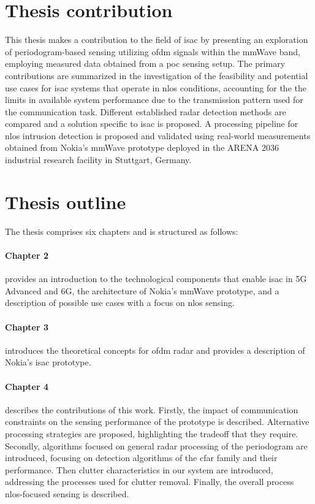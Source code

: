 \section{Thesis contribution}

This thesis makes a contribution to the field of \gls{isac} by presenting an exploration of periodogram-based sensing utilizing \gls{ofdm} signals within the mmWave band, employing measured data obtained from a \gls{poc} sensing setup.
The primary contributions are summarized in the investigation of the feasibility and potential use cases for \gls{isac} systems that operate in \gls{nlos} conditions, accounting for the the limits in available system performance due to the transmission pattern used for the communication task.
Different established radar detection methods are compared and a solution specific to \gls{isac} is proposed.
A processing pipeline for \gls{nlos} intrusion detection is proposed and validated using real-world measurements obtained from Nokia's mmWave prototype deployed in the ARENA 2036 industrial research facility in Stuttgart, Germany.

\section{Thesis outline}

The thesis comprises six chapters and is structured as follows:
\paragraph{Chapter 2} provides an introduction to the technological components that enable \gls{isac} in \gls{5G} Advanced and 6G, the architecture of Nokia's mmWave prototype, and a description of possible use cases with a focus on \gls{nlos} sensing.
\paragraph{Chapter 3} introduces the theoretical concepts for \gls{ofdm} radar and provides a description of Nokia's \gls{isac} prototype.
\paragraph{Chapter 4} describes the contributions of this work. Firstly, the impact of communication constraints on the sensing performance of the prototype is described. Alternative processing strategies are proposed, highlighting the tradeoff that they require.
Secondly, algorithms focused on general radar processing of the periodogram are introduced, focusing on detection algorithms of the \gls{cfar} family and their performance.
Then clutter characteristics in our system are introduced, addressing the processes used for clutter removal.
Finally, the overall process \gls{nlos}-focused sensing is described.
